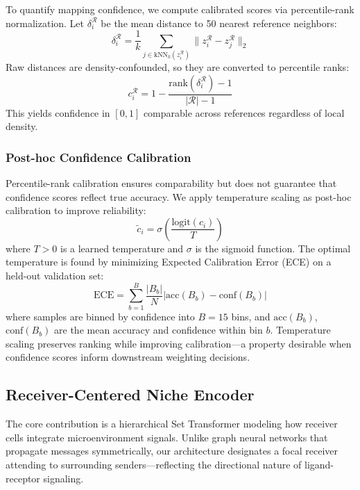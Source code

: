 To quantify mapping confidence, we compute calibrated scores via percentile-rank normalization. Let $\delta_i^{\mathcal{R}}$ be the mean distance to 50 nearest reference neighbors:
\begin{equation}
    \delta_i^{\mathcal{R}} = \frac{1}{k} \sum_{j \in \text{kNN}_k(z_i^{\mathcal{R}})} \|z_i^{\mathcal{R}} - z_j^{\mathcal{R}}\|_2
\end{equation}
Raw distances are density-confounded, so they are converted to percentile ranks:
\begin{equation}
    c_i^{\mathcal{R}} = 1 - \frac{\text{rank}(\delta_i^{\mathcal{R}}) - 1}{|\mathcal{R}| - 1}
\end{equation}
This yields confidence in $[0,1]$ comparable across references regardless of local density.

\subsubsection{Post-hoc Confidence Calibration}

Percentile-rank calibration ensures comparability but does not guarantee that confidence scores reflect true accuracy. We apply temperature scaling \cite{Guo2017-calibration} as post-hoc calibration to improve reliability:
\begin{equation}
    \tilde{c}_i = \sigma\left(\frac{\text{logit}(c_i)}{T}\right)
\end{equation}
where $T > 0$ is a learned temperature and $\sigma$ is the sigmoid function. The optimal temperature is found by minimizing Expected Calibration Error (ECE) on a held-out validation set:
\begin{equation}
    \text{ECE} = \sum_{b=1}^{B} \frac{|B_b|}{N} \left| \text{acc}(B_b) - \text{conf}(B_b) \right|
\end{equation}
where samples are binned by confidence into $B=15$ bins, and $\text{acc}(B_b)$, $\text{conf}(B_b)$ are the mean accuracy and confidence within bin $b$. Temperature scaling preserves ranking while improving calibration---a property desirable when confidence scores inform downstream weighting decisions.

\subsection{Receiver-Centered Niche Encoder}

The core contribution is a hierarchical Set Transformer modeling how receiver cells integrate microenvironment signals. Unlike graph neural networks that propagate messages symmetrically, our architecture designates a focal receiver attending to surrounding senders—reflecting the directional nature of ligand-receptor signaling.

